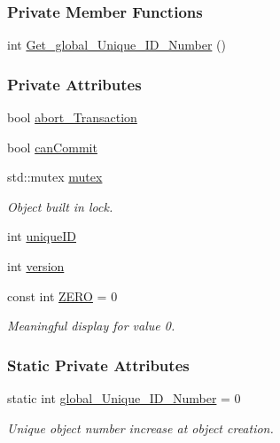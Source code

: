 \subsubsection*{Private Member Functions}
\begin{DoxyCompactItemize}
\item 
int \hyperlink{class_o_s_t_m_adee6903c1100e0d78640bd4b85e5d7df_adee6903c1100e0d78640bd4b85e5d7df}{Get\+\_\+global\+\_\+\+Unique\+\_\+\+I\+D\+\_\+\+Number} ()
\end{DoxyCompactItemize}
\subsubsection*{Private Attributes}
\begin{DoxyCompactItemize}
\item 
bool \hyperlink{class_o_s_t_m_a5121d9c4b08320b26beca82ba2f85c4a_a5121d9c4b08320b26beca82ba2f85c4a}{abort\+\_\+\+Transaction}
\item 
bool \hyperlink{class_o_s_t_m_a2a5b89641af274ddc69bdf8c1c1a07d6_a2a5b89641af274ddc69bdf8c1c1a07d6}{can\+Commit}
\item 
std\+::mutex \hyperlink{class_o_s_t_m_aaab0921fd1564b793f882a5002ec7106_aaab0921fd1564b793f882a5002ec7106}{mutex}
\begin{DoxyCompactList}\small\item\em Object built in lock. \end{DoxyCompactList}\item 
int \hyperlink{class_o_s_t_m_aa9fe59368b701af7f70befa23bd6901a_aa9fe59368b701af7f70befa23bd6901a}{unique\+ID}
\item 
int \hyperlink{class_o_s_t_m_a9a6ea36181be2db7f9082d77956511d7_a9a6ea36181be2db7f9082d77956511d7}{version}
\item 
const int \hyperlink{class_o_s_t_m_a0bb6ae8411d25f8e7b82d0a61729ea89_a0bb6ae8411d25f8e7b82d0a61729ea89}{Z\+E\+RO} = 0
\begin{DoxyCompactList}\small\item\em Meaningful display for value 0. \end{DoxyCompactList}\end{DoxyCompactItemize}
\subsubsection*{Static Private Attributes}
\begin{DoxyCompactItemize}
\item 
static int \hyperlink{class_o_s_t_m_acb617b9666d198c0de333c8613df0d4b_acb617b9666d198c0de333c8613df0d4b}{global\+\_\+\+Unique\+\_\+\+I\+D\+\_\+\+Number} = 0
\begin{DoxyCompactList}\small\item\em Unique object number increase at object creation. \end{DoxyCompactList}\end{DoxyCompactItemize}


